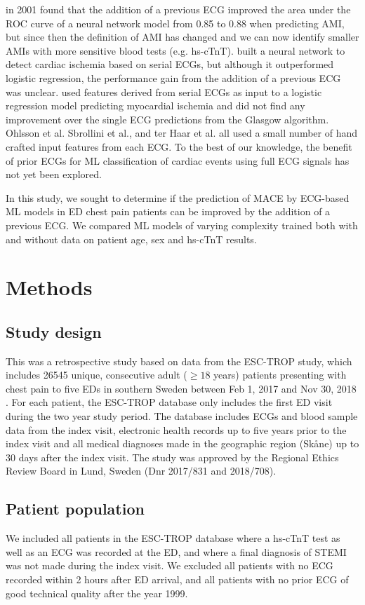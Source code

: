 \documentclass[preprint]{elsarticle}
\begin{document}
\citet{ohlsson2001} in 2001 found that the addition of a previous ECG improved the area under the ROC curve of a neural network model from 0.85 to 0.88 when predicting AMI, but since then the definition of AMI has changed and we can now identify smaller AMIs with more sensitive blood tests (e.g. hs-cTnT). \citet{sbrollini2019} built a neural network to detect cardiac ischemia based on serial ECGs, but although it outperformed logistic regression, the performance gain from the addition of a previous ECG was unclear. \citet{terhaar2019} used features derived from serial ECGs as input to a logistic regression model predicting myocardial ischemia and did not find any improvement over the single ECG predictions from the Glasgow algorithm. Ohlsson et al. Sbrollini et al., and ter Haar et al. all used a small number of hand crafted input features from each ECG. To the best of our knowledge, the benefit of prior ECGs for ML classification of cardiac events using full ECG signals has not yet been explored.

In this study, we sought to determine if the prediction of MACE by ECG-based ML models in ED chest pain patients can be improved by the addition of a previous ECG. We compared ML models of varying complexity trained both with and without data on patient age, sex and hs-cTnT results.

\section{Methods}
\subsection{Study design}
This was a retrospective study based on data from the ESC-TROP study, which includes 26545 unique, consecutive adult ($\geq 18$ years) patients presenting with chest pain to five EDs in southern Sweden between Feb 1, 2017 and Nov 30, 2018 \citep{mokhtari2020}. For each patient, the ESC-TROP database only includes the first ED visit during the two year study period. The database includes ECGs and blood sample data from the index visit, electronic health records up to five years prior to the index visit and all medical diagnoses made in the geographic region (Sk\aa{}ne) up to 30 days after the index visit. The study was approved by the Regional Ethics Review Board in Lund, Sweden (Dnr 2017/831 and 2018/708). 
\subsection{Patient population}
We included all patients in the ESC-TROP database where a hs-cTnT test as well as an ECG was recorded at the ED, and where a final diagnosis of STEMI was not made during the index visit. We excluded all patients with no ECG recorded within 2 hours after ED arrival, and all patients with no prior ECG of good technical quality after the year 1999.
\end{document}
